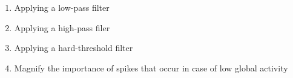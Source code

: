 \documentclass[final]{beamer}
\begin{document}
\begin{frame}
\begin{textblock}{0.35}
{\footnotesize 
\begin{enumerate}
\item Applying a low-pass filter
\item Applying a high-pass filer
\item Applying a hard-threshold filter 
\item Magnify the importance of spikes that occur in case of low global activity
\end{enumerate}}

\end{textblock}






\end{frame}

\end{document}
